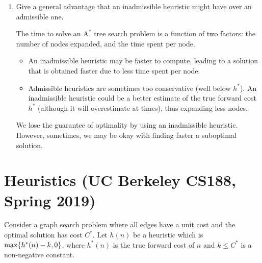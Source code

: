 \documentclass[11pt, a4paper]{article}
\def\Astar{$\text{A}^*$}
\begin{document}
\begin{enumerate}
    \item Give a general advantage that an inadmissible heuristic might have over an admissible one.
    
    \begin{solution}
        The time to solve an \Astar{} tree search problem is a function of two factors: the number of nodes expanded, and the time spent per node.
        \begin{itemize}
            \item An inadmissible heuristic may be faster to compute, leading to a solution that is obtained faster due to less time spent per node.
            \item Admissible heuristics are sometimes too conservative (well below $h^*$). An inadmissible heuristic could be a better estimate of the true forward cost $h^*$ (although it will overestimate at times), thus expanding less nodes. 
        \end{itemize}
        We lose the guarantee of optimality by using an inadmissible heuristic. However, sometimes, we may be okay with finding faster a suboptimal solution.
    \end{solution}
\end{enumerate}

\newpage

\section{Heuristics (UC Berkeley CS188, Spring 2019)}

Consider a graph search problem where all edges have a unit cost and the optimal solution has cost $C^*$. Let $h(n)$ be a heuristic which is $\max \{h^*(n) - k, 0\}$, where $h^*(n)$ is the true forward cost of $n$ and $k \leq C^*$ is a non-negative constant.
\end{document}
